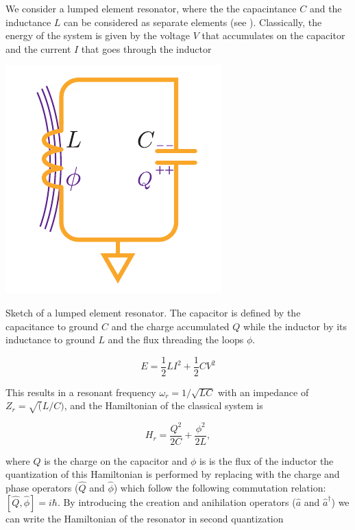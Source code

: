 
We consider a lumped element resonator, where the the capacintance $C$ and the inductance $L$ can be considered as separate elements (see ). Classically, the energy of the system is given by the voltage $V$ that accumulates on the capacitor and the current $I$ that goes through the inductor 

\begin{marginfigure}
    \includegraphics{chapter2/figures/resonator.pdf}
    \caption[Lumped element resonator]{Sketch of a lumped element resonator. The capacitor is defined by the capacitance to ground $C$ and the charge accumulated $Q$ while the inductor by its inductance to ground $L$ and the flux threading the loops $\phi$.}
\end{marginfigure}

\begin{equation}
    E = \frac{1}{2}LI^2 + \frac{1}{2}CV^2
\end{equation}

This results in a resonant frequency $\omega_r=1/\sqrt{LC}$ with an impedance of $Z_r = \sqrt(L/C)$, and the Hamiltonian of the classical system is 

\begin{equation}
    H_r =\frac{Q^2}{2C} + \frac{\phi^2}{2L}, 
\end{equation}

where $Q$ is the charge on the capacitor and $\phi$ is is the flux of the inductor the quantization of this Hamiltonian is performed by replacing with the charge and phase operators ($\hat{Q}$ and $\hat{\phi}$) which follow the following commutation relation: $[\hat{Q}, \hat{\phi}]=i\hbar$. By introducing the creation and anihilation operators ($\hat{a}$ and $\hat{a}^\dagger$) we can write the Hamiltonian of the resonator in second quantization

